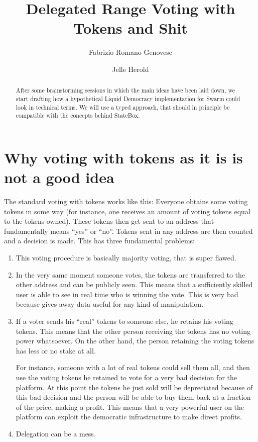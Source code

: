\documentclass[submission, copyright,creativecommons,sharealike,noncommercial]{eptcs}
\title{Delegated Range Voting with Tokens and Shit}
\author{Fabrizio Romano Genovese
	\institute{Swarm Team}
	\institute{Quantum Group \\ University of Oxford}
	\email{fabrizio@swarm.fund}
\and
Jelle Herold
	\institute{Swarm Team}
	\email{jelle@swarm.fund}
}
\begin{document}
%	
	
	\maketitle

	\begin{abstract}
		After some brainstorming sessions in which the main ideas have been laid down, we start drafting how a hypothetical Liquid Democracy implementation for Swarm could look in technical terms. We will use a typed approach, that should in principle be compatible with the concepts behind StateBox.
	\end{abstract}

\section{Why voting with tokens as it is is not a good idea}
	The standard voting with tokens works like this: Everyone obtains some voting tokens in some way (for instance, one receives an amount of voting tokens equal to the tokens owned). These tokens then get sent to an address that fundamentally means ``yes'' or ``no''. Tokens sent in any address are then counted and a decision is made. This has three fundamental problems:
	\begin{enumerate}
		\item This voting procedure is basically majority voting, that is super flawed.
		\item In the very same moment someone votes, the tokens are transferred to the other address and can be publicly seen. This means that a sufficiently skilled user is able to see in real time who is winning the vote. This is very bad because gives away data useful for any kind of manipulation.
		\item If a voter sends his ``real'' tokens to someone else, he retains his voting tokens. This means that the other person receiving the tokens has no voting power whatsoever. On the other hand, the person retaining the voting tokens has less or no stake at all.
		
		For instance, someone with a lot of real tokens could sell them all, and then use the voting tokens he retained to vote for a very bad decision for the platform. At this point the tokens he just sold will be depreciated because of this bad decision and the person will be able to buy them back at a fraction of the price, making a profit. This means that a very powerful user on the platform can exploit the democratic infrastructure to make direct profits.
		
		\item Delegation can be a mess.
	\end{enumerate}
\end{document}
